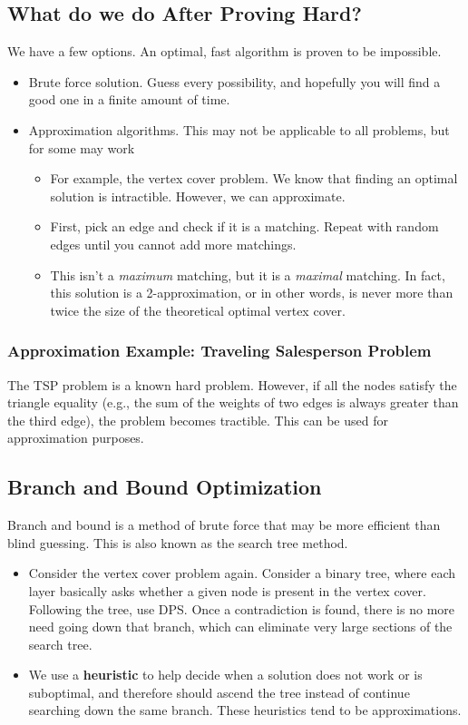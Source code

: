 \documentclass[10pt]{article}
\begin{document}
\subsection*{What do we do After Proving Hard?}
We have a few options.  An optimal, fast algorithm is proven to be impossible.
\begin{itemize}
	\item Brute force solution.  Guess every possibility, and hopefully you will find a good one in a finite amount of time.
	\item Approximation algorithms.  This may not be applicable to all problems, but for some may work
	\begin{itemize}
	    \item For example, the vertex cover problem.  We know that finding an optimal solution is intractible.  However, we can approximate.
	    \item First, pick an edge and check if it is a matching.  Repeat with random edges until you cannot add more matchings.  
	    \item This isn't a \textit{maximum} matching, but it is a \textit{maximal} matching.  In fact, this solution is a 2-approximation, or in other words, is never more than twice the size of the theoretical optimal vertex cover.    
    \end{itemize}
\end{itemize}

\subsubsection*{Approximation Example: Traveling Salesperson Problem}
The TSP problem is a known hard problem.  However, if all the nodes satisfy the triangle equality (e.g., the sum of the weights of two edges is always greater than the third edge), the problem becomes tractible.  This can be used for approximation purposes.

\subsection*{Branch and Bound Optimization}
Branch and bound is a method of brute force that may be more efficient than blind guessing.  This is also known as the search tree method.  
\begin{itemize}
	\item Consider the vertex cover problem again.  Consider a binary tree, where each layer basically asks whether a given node is present in the vertex cover.  Following the tree, use DPS.  Once a contradiction is found, there is no more need going down that branch, which can eliminate very large sections of the search tree.  
	\item We use a \textbf{heuristic} to help decide when a solution does not work or is suboptimal, and therefore should ascend the tree instead of continue searching down the same branch.  These heuristics tend to be approximations.
\end{itemize}
\end{document}
